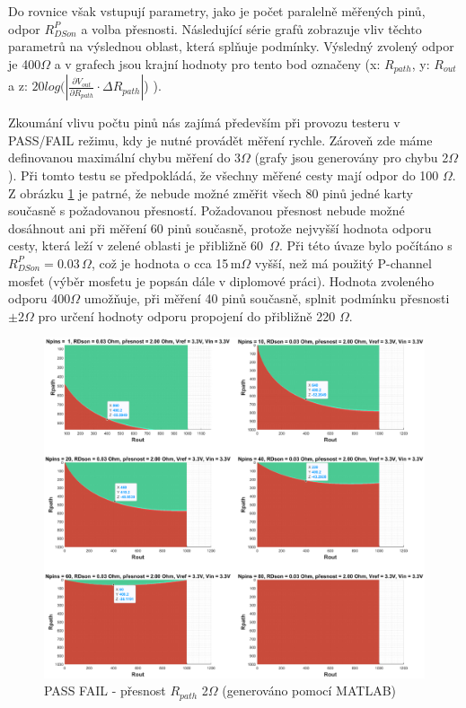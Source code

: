 Do rovnice však vstupují parametry, jako je počet paralelně měřených pinů,
odpor $R^P_{DSon}$ a volba přesnosti. Následující série grafů zobrazuje vliv
těchto parametrů na výslednou oblast, která splňuje podmínky.
Výsledný zvolený odpor je 400$\Omega$ a v grafech jsou krajní hodnoty pro tento bod označeny
(x: $R_{path}$, y: $R_{out}$ a  z: $20log(\left| \frac{\partial V_{out} }{\partial R_{path}}\cdot \Delta R_{path} \right|$) ).\par
\clearpage

Zkoumání vlivu počtu pinů nás zajímá především při provozu testeru v PASS/FAIL režimu,
kdy je nutné provádět měření rychle. Zároveň zde máme definovanou maximální chybu měření
do 3$\Omega$ (grafy jsou generovány pro chybu 2$\Omega$). Při tomto testu se předpokládá, že všechny měřené cesty mají odpor do 100 $\Omega$.
Z obrázku \ref{fig:PASS_FAIL 2 OHMS MEASUREMENT} je patrné, že nebude možné
změřit všech 80 pinů jedné karty současně s požadovanou přesností.
Požadovanou přesnost nebude možné dosáhnout ani při měření 60 pinů současně, protože nejvyšší hodnota odporu cesty,
která leží v zelené oblasti je přibližně 60\, $\Omega$.
Při této úvaze bylo počítáno s $R^P_{DSon} = 0.03\,\Omega$, což je hodnota o cca 15\,m$\Omega$ vyšší, než má použitý P-channel mosfet
(výběr mosfetu je popsán dále v diplomové práci).
Hodnota zvoleného odporu 400$\Omega$ umožňuje,
při měření 40 pinů současně, splnit podmínku přesnosti $\pm 2\Omega$ pro určení hodnoty odporu propojení do přibližně 220
$\Omega$.\par



\begin{figure}[ht!]
\centering
\includegraphics[width = 1\textwidth]{obrazky/PASS_FAIL_MERENI.eps}
\caption{PASS FAIL -  přesnost $R_{path}$ 2$\Omega$ (generováno pomocí MATLAB)}
\label{fig:PASS_FAIL 2 OHMS MEASUREMENT}
\end{figure}

